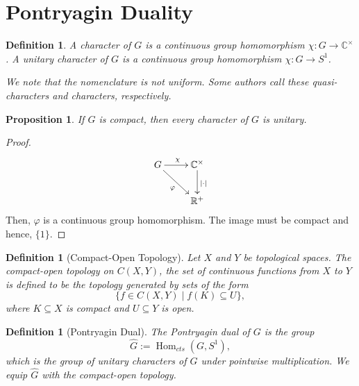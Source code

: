 \documentclass[12pt]{article}
\theoremstyle{thmstyle}
\newtheorem{proposition}[theorem]{Proposition}
\theoremstyle{defstyle}
\newtheorem{definition}[theorem]{Definition}
\newcommand{\R}{\mathbb{R}}
\newcommand{\bbC}{\mathbb{C}}
\newcommand{\Hom}{\operatorname{Hom}}
\newcommand{\wh}[1]{\widehat{#1}}
\begin{document}
\section{Pontryagin Duality}
\begin{center}
    \boxed{\textbf{\textcolor{red}{Henceforth, $G$ is a locally compact abelian topological group.}}}
\end{center}

\begin{definition}
    A \emph{character} of $G$ is a continuous group homomorphism $\chi: G\to\bbC^\times$. A \emph{unitary character} of $G$ is a continuous group homomorphism $\chi: G\to S^1$.

    We note that the nomenclature is not uniform. Some authors call these quasi-characters and characters, respectively.
\end{definition}

\begin{proposition}
    If $G$ is compact, then every character of $G$ is unitary.
\end{proposition}
\begin{proof}
    \begin{equation*}
        \xymatrix {
            G\ar[r]^{\chi}\ar[rd]_{\varphi} & \bbC^\times\ar[d]^{|\cdot|}\\
            & \R^+
        }
    \end{equation*}
    Then, $\varphi$ is a continuous group homomorphism. The image must be compact and hence, $\{1\}$.
\end{proof}

\begin{definition}[Compact-Open Topology]
    Let $X$ and $Y$ be topological spaces. The \emph{compact-open topology} on $C(X, Y)$, the set of continuous functions from $X$ to $Y$ is defined to be the topology generated by sets of the form 
    \begin{equation*}
        \{f\in C(X, Y)\mid f(K)\subseteq U\},
    \end{equation*}
    where $K\subseteq X$ is compact and $U\subseteq Y$ is open.
\end{definition}

\begin{definition}[Pontryagin Dual]
    The \emph{Pontryagin dual} of $G$ is the group 
    \begin{equation*}
        \wh G := \Hom_{cts}(G, S^1),
    \end{equation*}
    which is the group of unitary characters of $G$ under pointwise multiplication. We equip $\wh G$ with the \emph{compact-open topology}.
\end{definition}
\end{document}
